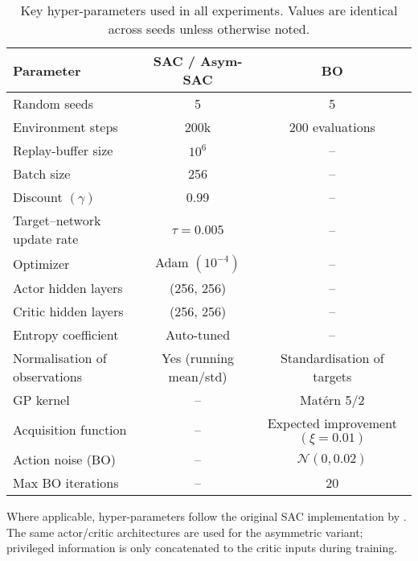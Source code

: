 \begin{table}[h]
\centering
\caption{Key hyper-parameters used in all experiments. Values are identical across seeds unless otherwise noted.}
\label{tab:hyperparams}
\begin{tabular}{lcc}
\toprule
Parameter & SAC / Asym-SAC & BO \\
\midrule
Random seeds & 5 & 5 \\
Environment steps & 200k & 200 evaluations \\
Replay-buffer size & $10^6$ & – \\
Batch size & 256 & – \\
Discount $(\gamma)$ & 0.99 & – \\
Target–network update rate & $\tau=0.005$ & – \\
Optimizer & Adam $(10^{-4})$ & – \\
Actor hidden layers & (256, 256) & – \\
Critic hidden layers & (256, 256) & – \\
Entropy coefficient & Auto-tuned & – \\
Normalisation of observations & Yes (running mean/std) & Standardisation of targets \\
GP kernel & – & Matérn 5/2 \\
Acquisition function & – & Expected improvement $(\xi=0.01)$ \\
Action noise (BO) & – & $\mathcal N(0, 0.02)$ \\
Max BO iterations & – & 20 \\
\bottomrule
\end{tabular}
\end{table}

Where applicable, hyper-parameters follow the original SAC implementation by \citet{haarnoja2018soft}. The same actor/critic architectures are used for the asymmetric variant; privileged information is only concatenated to the critic inputs during training.